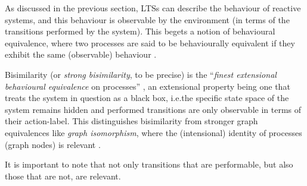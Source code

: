 %
\begin{isabellebody}%
%
%
\isadelimtheory
%
\endisadelimtheory
%
\isatagtheory
%
\endisatagtheory
{\isafoldtheory}%
%
\isadelimtheory
%
\endisadelimtheory
%
\isadelimdocument
%
\endisadelimdocument
%
\isatagdocument
%
\isamarkuptrue%
%
\endisatagdocument
{\isafolddocument}%
%
\isadelimdocument
%
\endisadelimdocument
%
\begin{isamarkuptext}%
\label{sec:strong_bisimilarity}%
\end{isamarkuptext}\isamarkuptrue%
%
\begin{isamarkuptext}%
As discussed in the previous section, LTSs can describe the behaviour of reactive systems, and this behaviour is observable by the environment (in terms of the transitions performed by the system). This begets a notion of behavioural equivalence, where two processes are said to be behaviourally equivalent if they exhibit the same (observable) behaviour \cite{resyst}.

Bisimilarity (or \emph{strong bisimilarity}, to be precise) is the \enquote{\emph{finest extensional behavioural equivalence} \textelp{} on processes} \cite{introBC}, an extensional property being one that treats the system in question as a black box, i.e.\@ the specific state space of the system remains hidden and performed transitions are only observable in terms of their action-label. This distinguishes bisimilarity from stronger graph equivalences like \emph{graph isomorphism}, where the (intensional) identity of processes (graph nodes) is relevant \cite{advBC_origins}.


It is important to note that not only transitions that are performable, but also those that are not, are relevant.


\end{isamarkuptext}
\end{isabellebody}
